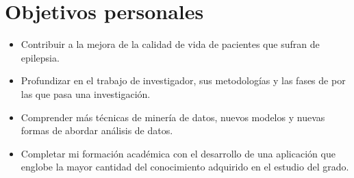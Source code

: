 \section{Objetivos personales}

\begin{itemize}
	\item Contribuir a la mejora de la calidad de vida de pacientes que sufran de epilepsia.
	\item Profundizar en el trabajo de investigador, sus metodologías y las fases de por las que pasa una investigación.
	\item Comprender más técnicas de minería de datos, nuevos modelos y nuevas formas de abordar análisis de datos.
	\item Completar mi formación académica con el desarrollo de una aplicación que englobe la mayor cantidad del conocimiento adquirido en el estudio del grado.
\end{itemize}